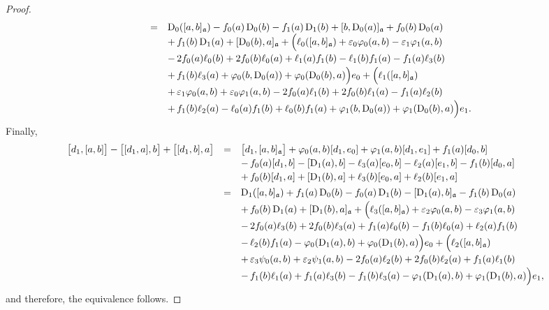\documentclass[10pt,a4paper]{amsart}
\newcommand{\D}{\operatorname{D}}
\newcommand{\ai}{\mathfrak{a}}
\begin{document}
\begin{proof}
\begin{equation*}
\begin{array}{r c l}
		&=&\D_0([a,b]_\ai)-f_0(a)\D_0(b)-f_1(a)\D_1(b)+[b,\D_0(a)]_\ai+f_0(b)\D_0(a)\\\vspace{0.75mm}
		&&+\,f_1(b)\D_1(a)+[\D_0(b),a]_\ai+\Big(\ell_0([a,b]_\ai)+\varepsilon_0\varphi_0(a,b)-\varepsilon_1\varphi_1(a,b)\\\vspace{0.75mm}
		&&-\,2f_0(a)\ell_0(b)+2f_0(b)\ell_0(a)+\ell_1(a)f_1(b)-\ell_1(b)f_1(a)-f_1(a)\ell_3(b)\\\vspace{0.75mm}
		&&+\,f_1(b)\ell_3(a)+\varphi_0(b,\D_0(a))+\varphi_0(\D_0(b),a)\Big)e_0+\Big(\ell_1([a,b]_\ai)\\\vspace{0.75mm}
		&&+\,\varepsilon_1\varphi_0(a,b)+\varepsilon_0\varphi_1(a,b)-2f_0(a)\ell_1(b)+2f_0(b)\ell_1(a)-f_1(a)\ell_2(b)\\
		&&+\,f_1(b)\ell_2(a)-\ell_0(a)f_1(b)+\ell_0(b)f_1(a)+\varphi_1(b,\D_0(a))+\varphi_1(\D_0(b),a)\Big)e_1.
	\end{array}
	\end{equation*}
	Finally, 
	\begin{equation*}
		\begin{array}{r c l}\vspace{0.75mm}
\big[d_1,[a,b]\big]-\big[[d_1,a],b\big]+\big[[d_1,b],a\big]&=&\big[d_1,[a,b]_\ai\big]+\varphi_0(a,b)[d_1,e_0]+\varphi_1(a,b)[d_1,e_1]+f_1(a)[d_0,b]\\\vspace{0.75mm}
&&-\,f_0(a)[d_1,b]-[\D_1(a),b]-\ell_3(a)[e_0,b]-\ell_2(a)[e_1,b]-f_1(b)[d_0,a]\\\vspace{1.5mm}
		&&+\,f_0(b)[d_1,a]+[\D_1(b),a]+\ell_3(b)[e_0,a]+\ell_2(b)[e_1,a]\\\vspace{0.75mm}
		&=&\D_1([a,b]_\ai)+f_1(a)\D_0(b)-f_0(a)\D_1(b)-[\D_1(a),b]_\ai-f_1(b)\D_0(a)\\\vspace{0.75mm}
		&&+\,f_0(b)\D_1(a)+[\D_1(b),a]_\ai+\Big(\ell_3([a,b]_\ai)+\varepsilon_2\varphi_0(a,b)-\varepsilon_3\varphi_1(a,b)\\\vspace{0.75mm}
		&&-\,2f_0(a)\ell_3(b)+2f_0(b)\ell_3(a)+f_1(a)\ell_0(b)-f_1(b)\ell_0(a)+\ell_2(a)f_1(b)\\\vspace{0.75mm}
		&&-\,\ell_2(b)f_1(a)-\varphi_0(\D_1(a),b)+\varphi_0(\D_1(b),a)\Big)e_0+\Big(\ell_2([a,b]_\ai)\\\vspace{0.75mm}
		&&+\,\varepsilon_3\psi_0(a,b)+\varepsilon_2\psi_1(a,b)-2f_0(a)\ell_2(b)+2f_0(b)\ell_2(a)+f_1(a)\ell_1(b)\\
		&&-\,f_1(b)\ell_1(a)+f_1(a)\ell_3(b)-f_1(b)\ell_3(a)-\varphi_1(\D_1(a),b)+\varphi_1(\D_1(b),a)\Big)e_1,
	\end{array}
\end{equation*}
and therefore, the equivalence follows.
\end{proof}
\end{document}
